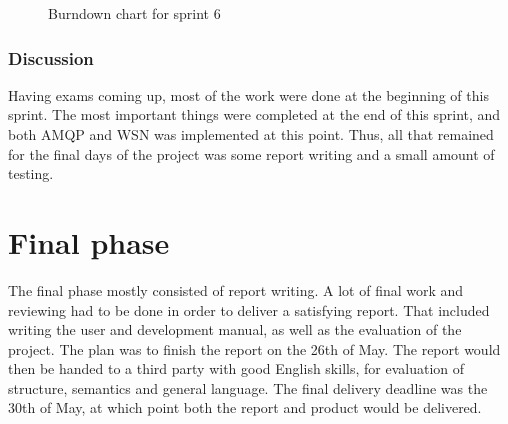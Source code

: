 \begin{center}
  \begin{figure}[ht!]
    \caption{Burndown chart for sprint 6}
    \label{fig:sprint 6, burndown}
  \end{figure}
\end{center}

\subsubsection{Discussion}
\label{subsec:project_lifecycle-development-sprint_6-discussion}

Having exams coming up, most of the work were done at the beginning of this sprint. The most important things were completed at the end of this sprint, and both AMQP and WSN was implemented at this point. Thus, all that remained for the final days of the project was some report writing and a small amount of testing. 

\section{Final phase}

The final phase mostly consisted of report writing. A lot of final work and reviewing had to be done in order to deliver a satisfying report. That included writing the user and development manual, as well as the evaluation of the project. The plan was to finish the report on the 26th of May. The report would then be handed to a third party with good English skills, for evaluation of structure, semantics and general language. The final delivery deadline was the 30th of May, at which point both the report and product would be delivered.
